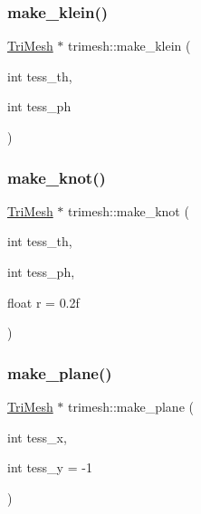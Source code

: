 \mbox{\label{namespacetrimesh_a01a882fe11f71ed777296a49ece62fa0}} 
\subsubsection{\texorpdfstring{make\+\_\+klein()}{make\_klein()}}
{\footnotesize\ttfamily \hyperlink{classtrimesh_1_1TriMesh}{Tri\+Mesh} $\ast$ trimesh\+::make\+\_\+klein (\begin{DoxyParamCaption}\item[{int}]{tess\+\_\+th,  }\item[{int}]{tess\+\_\+ph }\end{DoxyParamCaption})}

\mbox{\label{namespacetrimesh_ae54a06286a36b82cb706082d53fb70bc}} 
\subsubsection{\texorpdfstring{make\+\_\+knot()}{make\_knot()}}
{\footnotesize\ttfamily \hyperlink{classtrimesh_1_1TriMesh}{Tri\+Mesh} $\ast$ trimesh\+::make\+\_\+knot (\begin{DoxyParamCaption}\item[{int}]{tess\+\_\+th,  }\item[{int}]{tess\+\_\+ph,  }\item[{float}]{r = {\ttfamily 0.2f} }\end{DoxyParamCaption})}

\mbox{\label{namespacetrimesh_ab62642fc68697384e554928509b3d54e}} 
\subsubsection{\texorpdfstring{make\+\_\+plane()}{make\_plane()}}
{\footnotesize\ttfamily \hyperlink{classtrimesh_1_1TriMesh}{Tri\+Mesh} $\ast$ trimesh\+::make\+\_\+plane (\begin{DoxyParamCaption}\item[{int}]{tess\+\_\+x,  }\item[{int}]{tess\+\_\+y = {\ttfamily -\/1} }\end{DoxyParamCaption})}



